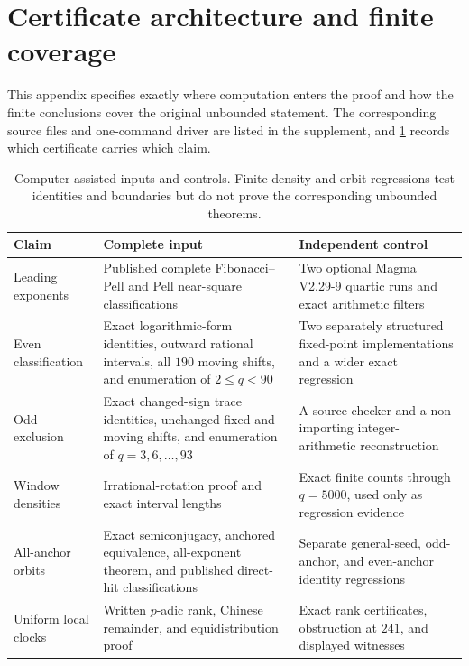 %
%
\section{Certificate architecture and finite coverage}
\label{app:certificates}

This appendix specifies exactly where computation enters the proof and how
the finite conclusions cover the original unbounded statement. The
corresponding source files and one-command driver are listed in the
supplement, and \cref{tab:certificates} records which certificate carries
which claim.

\begin{table}[H]
 \centering
 \caption{Computer-assisted inputs and controls. Finite density and orbit
 regressions test identities and boundaries but do not prove the corresponding
 unbounded theorems.}
 \label{tab:certificates}
 \begin{tabular}{>{\raggedright\arraybackslash}p{}
                 >{\raggedright\arraybackslash}p{}
                 >{\raggedright\arraybackslash}p{}}
  \toprule
  Claim & Complete input & Independent control\\
  \midrule
  Leading exponents
  & Published complete Fibonacci--Pell and Pell near-square classifications
  & Two optional Magma V2.29-9 quartic runs and exact arithmetic filters\\
  Even classification
  & Exact logarithmic-form identities, outward rational intervals, all $190$
    moving shifts, and enumeration of $2\leqslant q<90$
  & Two separately structured fixed-point implementations and a wider exact
    regression\\
  Odd exclusion
  & Exact changed-sign trace identities, unchanged fixed and moving shifts,
    and enumeration of $q=3,6,\ldots,93$
  & A source checker and a non-importing integer-arithmetic reconstruction\\
  Window densities
  & Irrational-rotation proof and exact interval lengths
  & Exact finite counts through $q=5000$, used only as regression evidence\\
  All-anchor orbits
  & Exact semiconjugacy, anchored equivalence, all-exponent theorem, and
    published direct-hit classifications
  & Separate general-seed, odd-anchor, and even-anchor identity regressions\\
  Uniform local clocks
  & Written $p$-adic rank, Chinese remainder, and equidistribution proof
  & Exact rank certificates, obstruction at $241$, and displayed witnesses\\
  \bottomrule
 \end{tabular}
\end{table}

